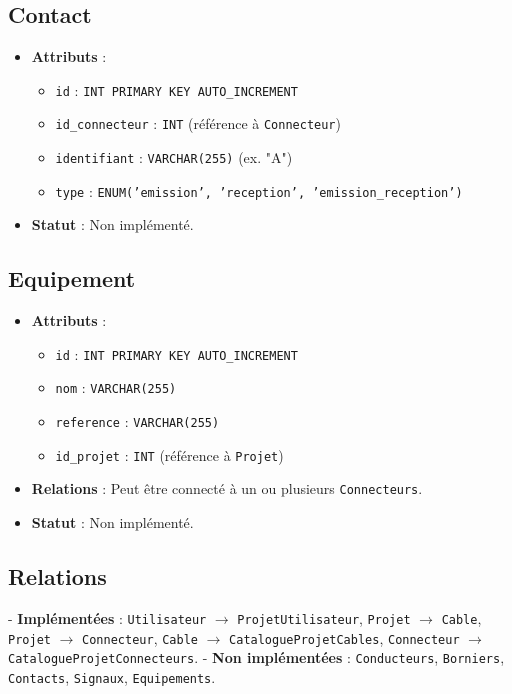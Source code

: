 \documentclass[a4paper,12pt]{article}
\begin{document}
\subsection{Contact}
\begin{itemize}
    \item \textbf{Attributs} :
    \begin{itemize}
        \item \texttt{id} : \texttt{INT PRIMARY KEY AUTO\_INCREMENT}
        \item \texttt{id\_connecteur} : \texttt{INT} (référence à \texttt{Connecteur})
        \item \texttt{identifiant} : \texttt{VARCHAR(255)} (ex. "A")
        \item \texttt{type} : \texttt{ENUM('emission', 'reception', 'emission\_reception')}
    \end{itemize}
    \item \textbf{Statut} : Non implémenté.
\end{itemize}

\subsection{Equipement}
\begin{itemize}
    \item \textbf{Attributs} :
    \begin{itemize}
        \item \texttt{id} : \texttt{INT PRIMARY KEY AUTO\_INCREMENT}
        \item \texttt{nom} : \texttt{VARCHAR(255)}
        \item \texttt{reference} : \texttt{VARCHAR(255)}
        \item \texttt{id\_projet} : \texttt{INT} (référence à \texttt{Projet})
    \end{itemize}
    \item \textbf{Relations} : Peut être connecté à un ou plusieurs \texttt{Connecteurs}.
    \item \textbf{Statut} : Non implémenté.
\end{itemize}

\subsection{Relations}
- \textbf{Implémentées} : \texttt{Utilisateur} $\to$ \texttt{ProjetUtilisateur}, \texttt{Projet} $\to$ \texttt{Cable}, \texttt{Projet} $\to$ \texttt{Connecteur}, \texttt{Cable} $\to$ \texttt{CatalogueProjetCables}, \texttt{Connecteur} $\to$ \texttt{CatalogueProjetConnecteurs}.
- \textbf{Non implémentées} : \texttt{Conducteurs}, \texttt{Borniers}, \texttt{Contacts}, \texttt{Signaux}, \texttt{Equipements}.
\end{document}
